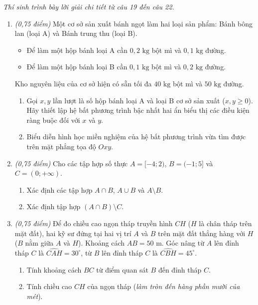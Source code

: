 \documentclass[12pt,a4paper]{article}
\newcommand{\parttitle}[1]{\par\vspace{1.5pt}{\large\bfseries\color{ink}#1}\par\vspace{1.0pt}}
\begin{document}
\parttitle{PHẦN IV. Tự luận}
\textit{Thí sinh trình bày lời giải chi tiết từ câu 19 đến câu 22.}
\begin{enumerate}[resume]
\item \textit{(0,75 điểm)} Một cơ sở sản xuất bánh ngọt làm hai loại sản phẩm: Bánh bông lan (loại A) và Bánh trung thu (loại B).
\begin{itemize}
    \item Để làm một hộp bánh loại A cần $0{,}2\text{ kg}$ bột mì và $0{,}1\text{ kg}$ đường.
    \item Để làm một hộp bánh loại B cần $0{,}1\text{ kg}$ bột mì và $0{,}2\text{ kg}$ đường.
\end{itemize}
Kho nguyên liệu của cơ sở hiện có sẵn tối đa $40\text{ kg}$ bột mì và $50\text{ kg}$ đường.
\begin{enumerate}
    \item Gọi $x, y$ lần lượt là số hộp bánh loại A và loại B cơ sở sản xuất ($x, y \ge 0$). Hãy thiết lập hệ bất phương trình bậc nhất hai ẩn biểu thị các điều kiện ràng buộc đối với $x$ và $y$.
    \item Biểu diễn hình học miền nghiệm của hệ bất phương trình vừa tìm được trên mặt phẳng tọa độ $Oxy$.
\end{enumerate}

\item \textit{(0,75 điểm)} Cho các tập hợp số thực $A = [-4; 2)$, $B = (-1; 5]$ và $C = (0; +\infty)$.
\begin{enumerate}
    \item Xác định các tập hợp $A \cap B$, $A \cup B$ và $A \setminus B$.
    \item Xác định tập hợp $(A \cap B) \setminus C$.
\end{enumerate}

\item \begin{minipage}[t]{0.63\linewidth}
\textit{(0,75 điểm)} Để đo chiều cao ngọn tháp truyền hình $CH$ ($H$ là chân tháp trên mặt đất), hai kỹ sư đứng tại hai vị trí $A$ và $B$ trên mặt đất thẳng hàng với $H$ ($B$ nằm giữa $A$ và $H$). Khoảng cách $AB = 50\text{ m}$. Góc nâng từ $A$ lên đỉnh tháp $C$ là $\widehat{CAH} = 30^\circ$, từ $B$ lên đỉnh tháp $C$ là $\widehat{CBH} = 45^\circ$.
\begin{enumerate}
    \item Tính khoảng cách $BC$ từ điểm quan sát $B$ đến đỉnh tháp $C$.
    \item Tính chiều cao $CH$ của ngọn tháp (\textit{làm tròn đến hàng phần mười của mét}).
\end{enumerate}
\end{minipage}%
\hfill
\begin{minipage}[t]{0.35\linewidth}
\centering
{}
\end{minipage}
\end{enumerate}
\end{document}

